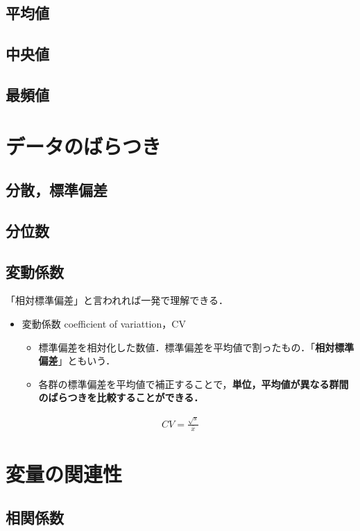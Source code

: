 \subsection{平均値}
\subsection{中央値}
\subsection{最頻値}

\section{データのばらつき}
\subsection{分散，標準偏差}
\subsection{分位数}
\subsection{変動係数}

「相対標準偏差」と言われれば一発で理解できる．

\begin{itemize}
  \item 変動係数 coefficient of variattion，CV
        \begin{itemize}
          \item 標準偏差を相対化した数値．標準偏差を平均値で割ったもの．「\textbf{相対標準偏差}」ともいう．
          \item 各群の標準偏差を平均値で補正することで，\textbf{単位，平均値が異なる群間のばらつきを比較することができる．}
        \end{itemize}
\end{itemize}

\begin{align}
  CV = \frac{\sqrt{s}}{\bar{x}}
\end{align}

\section{変量の関連性}

\subsection{相関係数}

